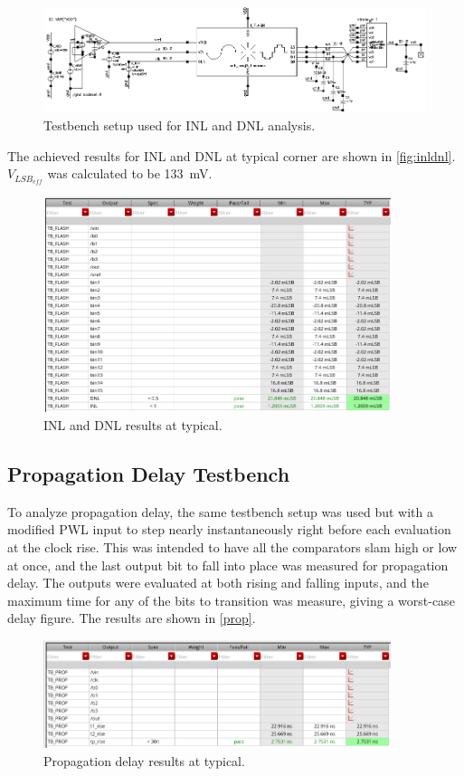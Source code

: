 \documentclass[11pt,letterpaper]{article}
\begin{document}
\begin{figure}[!t]
    \centering
    \includegraphics[width=6in]{flash_tb.eps}
    \caption{Testbench setup used for INL and DNL analysis.}\label{fig:tb-sch}
\end{figure}

The achieved results for INL and DNL at typical corner are shown in \cref{fig:inldnl}. \(V_{LSB_{eff}}\) was calculated to be \qty{133}{\mV}.

\begin{figure}[htbp!]
    \centering
    \includegraphics[width=4in]{INL_DNL_TYP_old.png}
    \caption{INL and DNL results at typical.}\label{fig:prop-plot}
\end{figure}

\subsection{Propagation Delay Testbench}

To analyze propagation delay, the same testbench setup was used but with a modified PWL input to step nearly instantaneously right before each evaluation at the clock rise. This was intended to have all the comparators slam high or low at once, and the last output bit to fall into place was measured for propagation delay. The outputs were evaluated at both rising and falling inputs, and the maximum time for any of the bits to transition was measure, giving a worst-case delay figure. The results are shown in \cref{prop}.

\begin{figure}[htbp!]
    \centering
    \includegraphics[width=4in]{TP_TYP_old.png}
    \caption{Propagation delay results at typical.}\label{fig:prop}
\end{figure}
\end{document}
